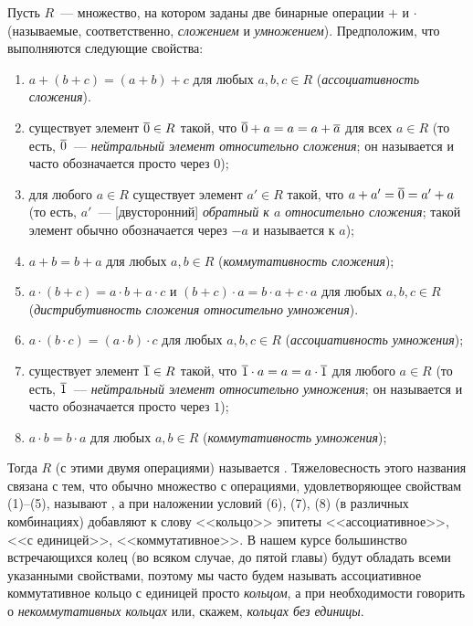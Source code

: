 \begin{definition}\label{def:ring}
Пусть $R$~--- множество, на котором заданы две бинарные операции $+$ и
$\cdot$ (называемые, соответственно, {\it сложением} и {\it умножением}).
Предположим, что выполняются следующие свойства:
\begin{enumerate}
\item $a+(b+c) = (a+b)+c$ для любых $a,b,c\in R$ ({\it ассоциативность
    сложения}).
\item\label{ring_property:zero} существует элемент $\overline{0}\in
  R$ такой, что $\overline{0} + a = a = a
  + \overline{a}$ для всех $a\in R$ (то есть, $\overline{0}$~--- {\it нейтральный
    элемент относительно сложения}; он называется
   и часто
  обозначается просто через $0$);
\item\label{ring_property:minus} для любого $a\in R$ существует
  элемент $a'\in R$ такой, что $a +
  a' = \overline{0} = a' + a$ (то есть, $a'$~--- [двусторонний] {\it обратный к
  $a$ относительно сложения}; такой элемент обычно обозначается через
  $-a$ и называется
   к $a$);
\item $a+b = b+a$ для любых $a,b\in R$ ({\it коммутативность
    сложения});
\item $a\cdot (b+c) = a\cdot b + a\cdot c$ и $(b+c)\cdot a = b\cdot a
  + c\cdot a$ для любых $a,b,c\in R$ ({\it дистрибутивность сложения
    относительно умножения}).
\item $a\cdot (b\cdot c) = (a\cdot b)\cdot c$ для любых $a,b,c\in R$
  ({\it ассоциативность умножения});
\item\label{ring_property:one} существует элемент $\overline{1}\in R$ такой, что $\overline{1}\cdot a = a =
  a\cdot\overline{1}$ для любого $a\in R$ (то есть, $\overline{1}$~---
  {\it нейтральный элемент относительно умножения}; он называется
   и часто обозначается просто
  через $1$);
\item $a\cdot b = b\cdot a$ для любых $a,b\in R$ ({\it коммутативность
    умножения});
\end{enumerate}
Тогда $R$ (с этими двумя операциями) называется . Тяжеловесность
этого названия
связана с тем, что обычно множество с операциями, удовлетворяющее
свойствам (1)--(5), называют , а при наложении условий
(6), (7), (8) (в различных комбинациях) добавляют к слову <<кольцо>>
эпитеты <<ассоциативное>>, <<с единицей>>, <<коммутативное>>. В нашем
курсе большинство встречающихся колец (во всяком случае, до пятой
главы) будут обладать всеми указанными
свойствами, поэтому мы часто будем называть ассоциативное коммутативное
кольцо с единицей просто {\it кольцом}, а при необходимости говорить о
{\it некоммутативных кольцах} или, скажем, {\it кольцах без единицы}.
\end{definition}

